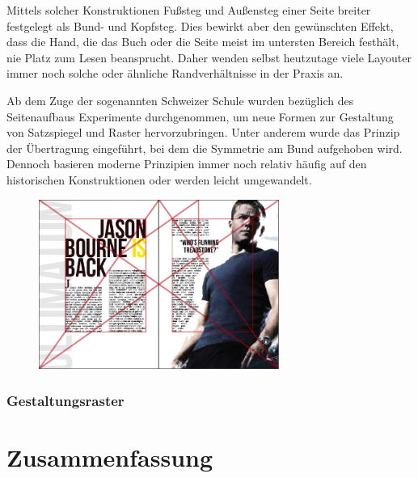 \documentclass[12pt,a4paper]{article}
\begin{document}
Mittels solcher Konstruktionen Fußsteg und Außensteg einer Seite breiter festgelegt als Bund- und Kopfsteg. Dies bewirkt aber den gewünschten Effekt, dass die Hand, die das Buch oder die Seite meist im untersten Bereich festhält, nie Platz zum Lesen beansprucht. Daher wenden selbst heutzutage viele Layouter immer noch solche oder ähnliche Randverhältnisse in der Praxis an.

Ab dem Zuge der sogenannten Schweizer Schule wurden bezüglich des Seitenaufbaus Experimente durchgenommen, um neue Formen zur Gestaltung von Satzspiegel und Raster hervorzubringen. Unter anderem wurde das Prinzip der Übertragung eingeführt, bei dem die Symmetrie am Bund aufgehoben wird. Dennoch basieren moderne Prinzipien immer noch relativ häufig auf den historischen Konstruktionen oder werden leicht umgewandelt. %

\begin{figure}[htbp]
\centering
\includegraphics[width=0.7\textwidth]{Bilder/jsonBourne2.jpg}
\label{fig:modernSatz}
\end{figure}

\subsubsection{Gestaltungsraster}

\newpage
\section{Zusammenfassung}

\newpage
\listoffigures

\newpage
\nocite{proCG}
\nocite{perspectivesOnProGeo}
\nocite{doppelVerhaeltnis}
\nocite{proGeoGrundlagen}


\end{document}
